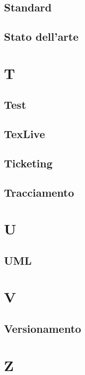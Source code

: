 \documentclass[12pt]{article}
\begin{document}
		\subsection{Standard}
		\subsection{Stato dell'arte}
	\clearpage
	\section{T}
		\subsection{Test}
		\subsection{TexLive}
		\subsection{Ticketing}
		\subsection{Tracciamento}
	\clearpage
	\section{U}
		\subsection{UML}
	\clearpage
	\section{V}
		\subsection{Versionamento}
	\clearpage
	\section{Z}	
\end{document}
